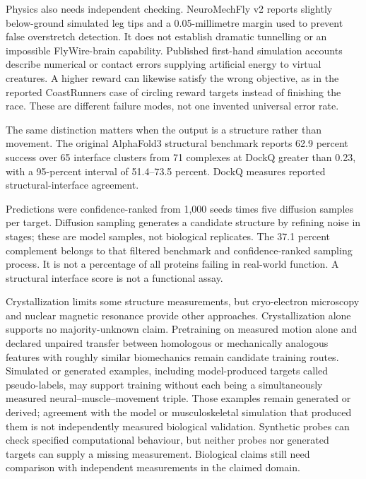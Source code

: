 Physics also needs independent checking. NeuroMechFly v2 reports slightly
below-ground simulated leg tips and a 0.05-millimetre margin used to prevent
false overstretch detection. It does not establish dramatic tunnelling or an
impossible FlyWire-brain capability.\citep{neuromechfly2024} Published first-hand
simulation accounts describe numerical or contact errors supplying artificial
energy to virtual creatures. A higher reward can likewise satisfy the wrong
objective, as in the reported CoastRunners case of circling reward targets
instead of finishing the race.\citep{surprises2018,specgaming2020}
These are different failure modes, not one invented universal error rate.

The same distinction matters when the output is a structure rather than movement. The original AlphaFold3 structural benchmark reports 62.9 percent success over 65 interface clusters from 71 complexes at DockQ greater than 0.23, with a 95-percent interval of 51.4--73.5 percent. DockQ measures reported structural-interface agreement.

Predictions were confidence-ranked from 1,000 seeds times five diffusion samples per target. Diffusion sampling generates a candidate structure by refining noise in stages; these are model samples, not biological replicates. The 37.1 percent complement belongs to that filtered benchmark and confidence-ranked sampling process. It is not a percentage of all proteins failing in real-world function. A structural interface score is not a functional assay.\citep{alphafold32024}

Crystallization limits some structure measurements, but cryo-electron microscopy and nuclear magnetic resonance provide other approaches. Crystallization alone supports no majority-unknown claim.\citep{pdbmethods} Pretraining on measured motion alone and declared unpaired transfer between homologous or mechanically analogous features with roughly similar biomechanics remain candidate training routes. Simulated or generated examples, including model-produced targets called pseudo-labels, may support training without each being a simultaneously measured neural--muscle--movement triple. Those examples remain generated or derived; agreement with the model or musculoskeletal simulation that produced them is not independently measured biological validation. Synthetic probes can check specified computational behaviour, but neither probes nor generated targets can supply a missing measurement. Biological claims still need comparison with independent measurements in the claimed domain.

